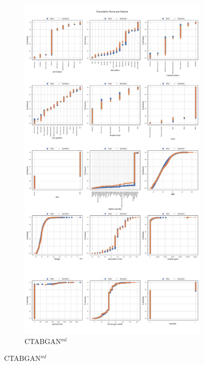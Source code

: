 \begin{landscape}
	\begin{figure}[h]
		\centering
		\hfill
		\begin{subfigure}{0.3\linewidth}
			\includegraphics[height=\textheight,width=\linewidth,keepaspectratio]{images/cumsums/ctabgan.jpg}
			\caption{CTABGAN$^{ml}$}
		\end{subfigure}

\end{figure}
\end{landscape}
